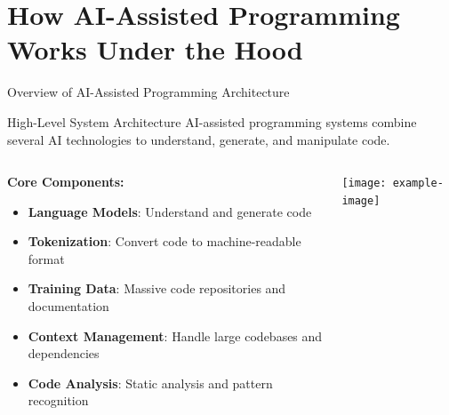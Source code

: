 \documentclass{beamer}
\begin{document}
\section{How AI-Assisted Programming Works Under the Hood}

\begin{frame}[t]{Overview of AI-Assisted Programming Architecture}
    \begin{block}{High-Level System Architecture}
        AI-assisted programming systems combine several AI technologies to understand, generate, and manipulate code.
    \end{block}
    
    \begin{columns}[t]
        \begin{column}{0.6\textwidth}
            \textbf{Core Components:}
            \begin{itemize}
                \item \textbf{Language Models}: Understand and generate code
                \item \textbf{Tokenization}: Convert code to machine-readable format
                \item \textbf{Training Data}: Massive code repositories and documentation
                \item \textbf{Context Management}: Handle large codebases and dependencies
                \item \textbf{Code Analysis}: Static analysis and pattern recognition
            \end{itemize}
        \end{column}
        \begin{column}{0.4\textwidth}
            \centering
            \texttt{[image: example-image]} %
        \end{column}
    \end{columns}
\end{frame}
\end{document}
